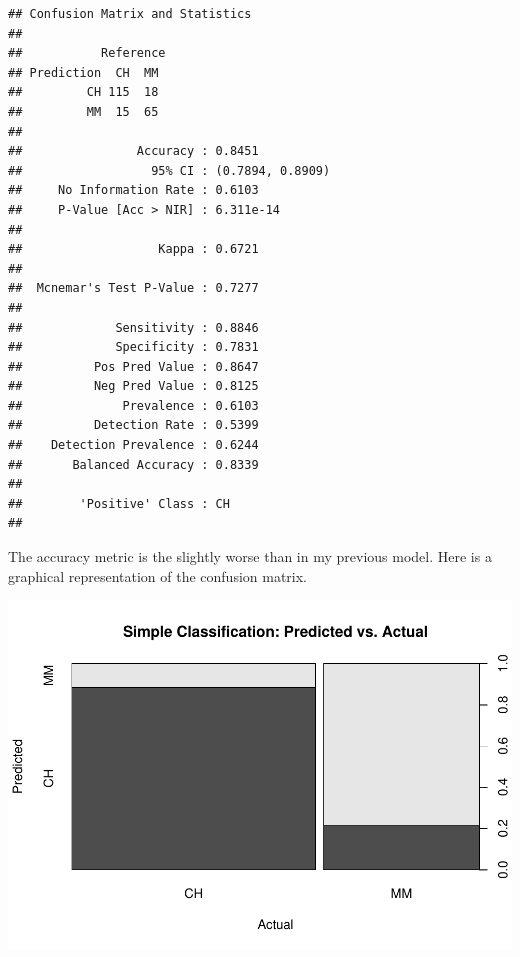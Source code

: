 \documentclass[
]{book}
\newenvironment{Shaded}{\begin{snugshade}}{\end{snugshade}}
\newcommand{\DataTypeTok}[1]{\textcolor[rgb]{0.13,0.29,0.53}{#1}}
\newcommand{\DecValTok}[1]{\textcolor[rgb]{0.00,0.00,0.81}{#1}}
\newcommand{\KeywordTok}[1]{\textcolor[rgb]{0.13,0.29,0.53}{\textbf{#1}}}
\newcommand{\NormalTok}[1]{#1}
\newcommand{\OperatorTok}[1]{\textcolor[rgb]{0.81,0.36,0.00}{\textbf{#1}}}
\newcommand{\StringTok}[1]{\textcolor[rgb]{0.31,0.60,0.02}{#1}}
\begin{document}
\begin{verbatim}
## Confusion Matrix and Statistics
## 
##           Reference
## Prediction  CH  MM
##         CH 115  18
##         MM  15  65
##                                           
##                Accuracy : 0.8451          
##                  95% CI : (0.7894, 0.8909)
##     No Information Rate : 0.6103          
##     P-Value [Acc > NIR] : 6.311e-14       
##                                           
##                   Kappa : 0.6721          
##                                           
##  Mcnemar's Test P-Value : 0.7277          
##                                           
##             Sensitivity : 0.8846          
##             Specificity : 0.7831          
##          Pos Pred Value : 0.8647          
##          Neg Pred Value : 0.8125          
##              Prevalence : 0.6103          
##          Detection Rate : 0.5399          
##    Detection Prevalence : 0.6244          
##       Balanced Accuracy : 0.8339          
##                                           
##        'Positive' Class : CH              
## 
\end{verbatim}

The accuracy metric is the slightly worse than in my previous model. Here is a graphical representation of the confusion matrix.

\begin{Shaded}
\end{Shaded}

\includegraphics{data-sci_files/figure-latex/unnamed-chunk-59-1.pdf}
\end{document}
